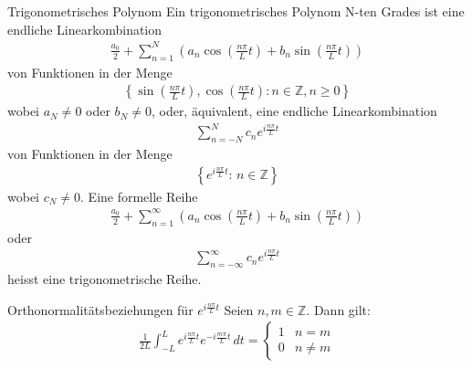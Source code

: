 \documentclass[a4paper,10pt]{article}
\begin{document}
\begin{subbox}{Trigonometrisches Polynom}
  Ein trigonometrisches Polynom N-ten Grades ist eine endliche Linearkombination
   \begin{align*} \frac{a_0}{2}+\sum_{n=1}^N\left(a_n\cos\left(\frac{n\pi}{L}t\right)+b_n\sin\left(\frac{n\pi}{L}t\right)\right) \end{align*}
   von Funktionen in der Menge
    \begin{align*} \left\{\sin\left(\frac{n\pi}{L}t\right),\cos\left(\frac{n\pi}{L}t\right): n\in\mathbb{Z}, n\geq0\right\} \end{align*}
    wobei \(a_N\neq0\) oder \(b_N\neq0\), oder, äquivalent, eine endliche Linearkombination \begin{align*} \sum_{n=-N}^Nc_ne^{ i\frac{n\pi}{L}t} \end{align*}
     von Funktionen in der Menge \begin{align*} \left\{e^{ i\frac{n\pi}{L}t}:\,n\in\mathbb{Z}\right\} \end{align*} wobei \(c_N\neq0\). Eine formelle Reihe \begin{align*} \frac{a_0}{2}+\sum_{n=1}^\infty\left(a_n\cos\left(\frac{n\pi}{L}t\right)+b_n\sin\left(\frac{n\pi}{L}t\right)\right) \end{align*} oder \begin{align*} \sum_{n=-\infty}^\infty c_ne^{ i\frac{n\pi}{L}t} \end{align*} heisst eine trigonometrische Reihe.
 
\end{subbox}

\begin{subbox}{Orthonormalitätsbeziehungen für $e^{i\frac{n\pi}{L}t}$}
  Seien \(n,m\in\mathbb{Z}\). Dann gilt: \begin{align*} \frac{1}{2L}\int_{-L}^L e^{ i \frac{n\pi}{L}t}e^{- i \frac{m\pi}{L}t}\,dt =\begin{cases} 1&n=m\\ 0&n\neq m \end{cases} \end{align*}
\end{subbox}
\end{document}
